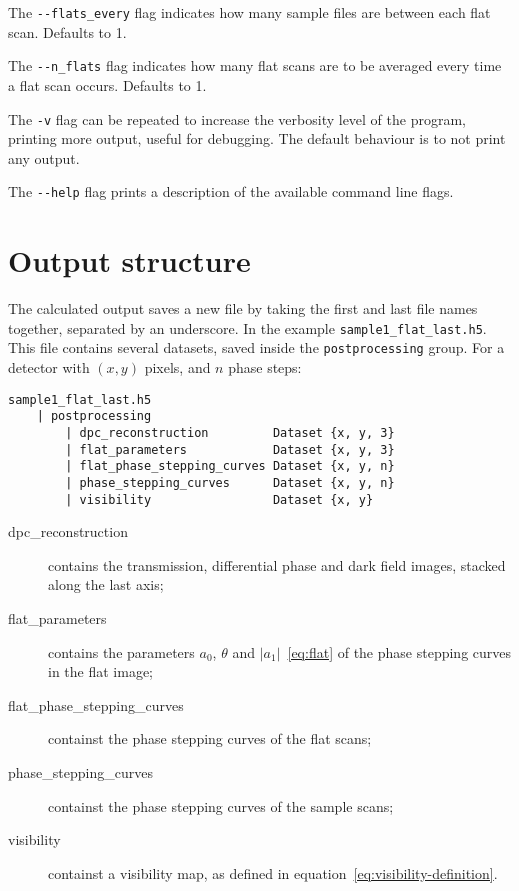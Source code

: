 The \verb|--flats_every| flag indicates how many sample files are between
each flat scan. Defaults to 1.

The \verb|--n_flats| flag indicates how many flat scans are to be
averaged every time a flat scan occurs. Defaults to 1.


The \verb|-v| flag can be repeated to increase the verbosity level of the
program, printing more output, useful for debugging. The default behaviour
is to not print any output.

The \verb|--help| flag prints a description of the available command line
flags.

\section{Output structure}
The calculated output saves a new file by taking the first and last file
names together, separated by an underscore. In the example \verb|sample1_flat_last.h5|.
This file contains several datasets, saved inside the \texttt{postprocessing}
group. For a detector with $(x, y)$ pixels, and $n$ phase steps:
\begin{lstlisting}
sample1_flat_last.h5
    | postprocessing
        | dpc_reconstruction         Dataset {x, y, 3}
        | flat_parameters            Dataset {x, y, 3}
        | flat_phase_stepping_curves Dataset {x, y, n}
        | phase_stepping_curves      Dataset {x, y, n}
        | visibility                 Dataset {x, y}
\end{lstlisting}

\begin{description}
    \item[dpc\_reconstruction] contains the transmission, differential
        phase and dark field images, stacked along the last axis;
    \item[flat\_parameters] contains the parameters $a_0$, $\theta$
        and $|a_1|$~\eqref{eq:flat} of the phase stepping curves in the flat
        image;
    \item[flat\_phase\_stepping\_curves] containst the phase stepping
        curves of the flat scans;
    \item[phase\_stepping\_curves] containst the phase stepping
        curves of the sample scans;
    \item[visibility] containst a visibility map, as defined in
        equation~\eqref{eq:visibility-definition}.
\end{description}
